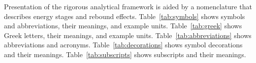 
Presentation of the rigorous analytical framework is aided by a 
nomenclature that describes energy stages and rebound effects.
Table~\ref{tab:symbols} shows symbols and abbreviations, their meanings, and example units.
Table~\ref{tab:greek} shows Greek letters, their meanings, and example units.
Table~\ref{tab:abbreviations} shows abbreviations and acronyms.
Table~\ref{tab:decorations} shows symbol decorations and their meanings.
Table~\ref{tab:subscripts} shows subscripts and their meanings.



